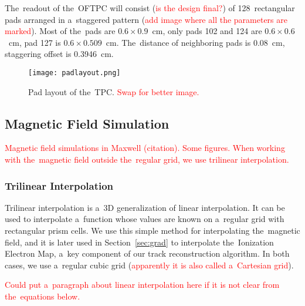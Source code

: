 				The~readout of the~\ac{OFTPC} will consist (\textcolor{red}{is the design final?}) of 128~rectangular pads arranged in a~staggered pattern (\textcolor{red}{add image where all the parameters are marked}). Most of the~pads are $0.6 \times 0.9$~cm, only pads 102 and 124 are $0.6 \times 0.6$~cm, pad 127 is $0.6 \times 0.509$~cm. The~distance of neighboring pads is 0.08~cm, staggering offset is 0.3946~cm.
			
				\begin{figure}[H]
					\centering
					\texttt{[image: padlayout.png]}
					\caption{Pad layout of the~TPC. \textcolor{red}{Swap for better image.}}
					\label{fig:padlayout}
				\end{figure}
		
		\subsection{Magnetic Field Simulation}
		\label{sec:mag}
			\textcolor{red}{Magnetic field simulations in Maxwell (citation). Some figures. When working with the~magnetic field outside the~regular grid, we use trilinear interpolation.}
		
			\subsubsection{Trilinear Interpolation}
			\label{sec:trilin}
				Trilinear interpolation is a~3D generalization of linear interpolation. It can be used to interpolate a~function whose values are known on a~regular grid with rectangular prism cells. We use this simple method for interpolating the~magnetic field, and it is later used in Section~\ref{sec:grad} to interpolate the~Ionization Electron Map, a~key component of our track reconstruction algorithm. In both cases, we use a~regular cubic grid (\textcolor{red}{apparently it is also called a~Cartesian grid}).
				
				\textcolor{red}{Could put a~paragraph about linear interpolation here if it is not clear from the~equations below.}
				
